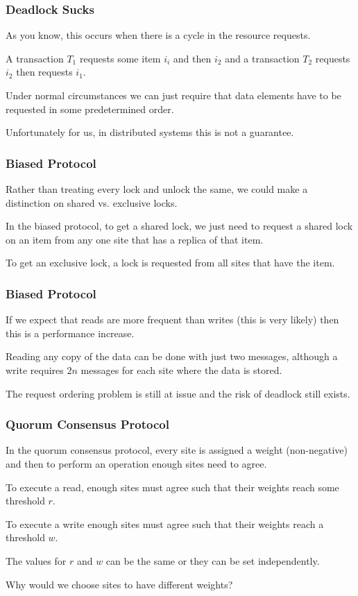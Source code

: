 \begin{frame}
\frametitle{Deadlock Sucks}

As you know, this occurs when there is a cycle in the resource requests. 

A transaction $T_{1}$ requests some item $i_{i}$ and then $i_{2}$ and a transaction $T_{2}$ requests $i_{2}$ then requests $i_{1}$. 

Under normal circumstances we can just require that data elements have to be requested in some predetermined order.

Unfortunately for us, in distributed systems this is not a guarantee.

\end{frame}


\begin{frame}
\frametitle{Biased Protocol}

Rather than treating every lock and unlock the same, we could make a distinction on shared vs. exclusive locks. 

In the biased protocol, to get a shared lock, we just need to request a shared lock on an item from any one site that has a replica of that item. 

To get an exclusive lock, a lock is requested from all sites that have the item.

\end{frame}


\begin{frame}
\frametitle{Biased Protocol}

If we expect that reads are more frequent than writes (this is very likely) then this is a performance increase. 

Reading any copy of the data can be done with just two messages, although a write requires $2n$ messages for each site where the data is stored. 

The request ordering problem is still at issue and the risk of deadlock still exists.

\end{frame}



\begin{frame}
\frametitle{Quorum Consensus Protocol}

In the \alert{quorum consensus protocol}, every site is assigned a weight (non-negative) and then to perform an operation enough sites need to agree. 

To execute a read, enough sites must agree such that their weights reach some threshold $r$. 

To execute a write enough sites must agree such that their weights reach a threshold $w$. 

The values for $r$ and $w$ can be the same or they can be set independently.

Why would we choose sites to have different weights? 

\end{frame}

